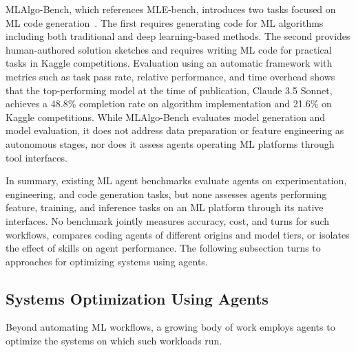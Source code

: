 \documentclass[
english,                 %
bibtex,                  %
]{kththesis}
\numberwithin{listing}{chapter}
\begin{document}
\gls{ML}Algo-Bench, which references \gls{MLE}-bench, introduces two tasks focused on \gls{ML} code generation~\cite{wang_mlalgo-bench_2025}. The first requires generating code for \gls{ML} algorithms including both traditional and deep learning-based methods. The second provides human-authored solution sketches and requires writing \gls{ML} code for practical tasks in Kaggle competitions. Evaluation using an automatic framework with metrics such as task pass rate, relative performance, and time overhead shows that the top-performing model at the time of publication, Claude 3.5 Sonnet, achieves a 48.8\% completion rate on algorithm implementation and 21.6\% on Kaggle competitions. While \gls{ML}Algo-Bench evaluates model generation and model evaluation, it does not address data preparation or feature engineering as autonomous stages, nor does it assess agents operating \gls{ML} platforms through tool interfaces.

In summary, existing \gls{ML} agent benchmarks evaluate agents on experimentation, engineering, and code generation tasks, but none assesses agents performing feature, training, and inference tasks on an \gls{ML} platform through its native interfaces. No benchmark jointly measures accuracy, cost, and turns for such workflows, compares coding agents of different origins and model tiers, or isolates the effect of skills on agent performance. The following subsection turns to approaches for optimizing systems using agents.

\subsection{Systems Optimization Using Agents}
\label{sec:bg_systems_optimization_using_agents}
\glsresetall

Beyond automating \gls{ML} workflows, a growing body of work employs agents to optimize the systems on which such workloads run.
\end{document}
